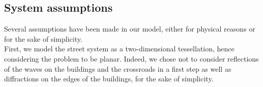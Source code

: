 \documentclass[conference]{IEEEtran}
\begin{document}
\subsection{System assumptions}
\label{assumption}
Several assumptions have been made in our model, either for physical reasons or for the sake of simplicity.  \\
\indent First, we model the street system as a two-dimensional tessellation, hence considering the problem to be planar. Indeed, we chose not to consider reflections of the waves on the buildings and the crossroads in a first step as well as diffractions on the edges of the buildings, for the sake of simplicity. \\
\end{document}
